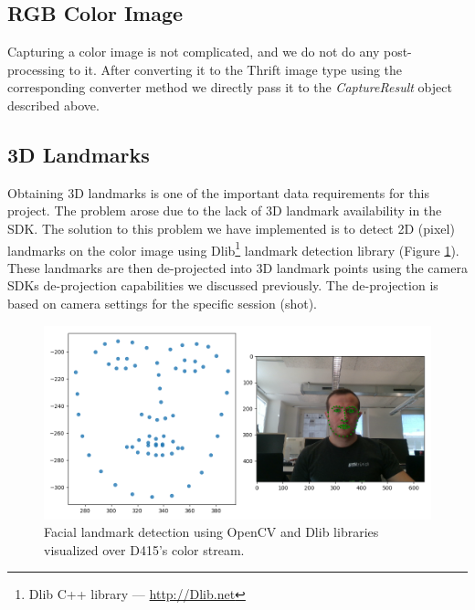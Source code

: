 \subsection{RGB Color Image}
Capturing a color image is not complicated, and we do not do any post-processing to it. After converting it to the Thrift image type using the corresponding converter method we directly pass it to the \textit{CaptureResult} object described above.

\subsection{3D Landmarks}\label{s3.3.2}
Obtaining 3D landmarks is one of the important data requirements for this project. The problem arose due to the lack of 3D landmark availability in the SDK. The solution to this problem we have implemented is to detect 2D (pixel) landmarks on the color image using Dlib\footnote{Dlib C++ library — \url{http://Dlib.net}} landmark detection library (Figure \ref{f3.6}). These landmarks are then de-projected into 3D landmark points using the camera SDKs de-projection capabilities we discussed previously. The de-projection is based on camera settings for the specific session (shot).

\begin{figure}[h]
  \centering
  \includegraphics[width=\textwidth]{Figures/Pictures/lmoverlay.png}
  \caption{Facial landmark detection using OpenCV and Dlib libraries visualized over D415's color stream.}
  \label{f3.6}
\end{figure}

